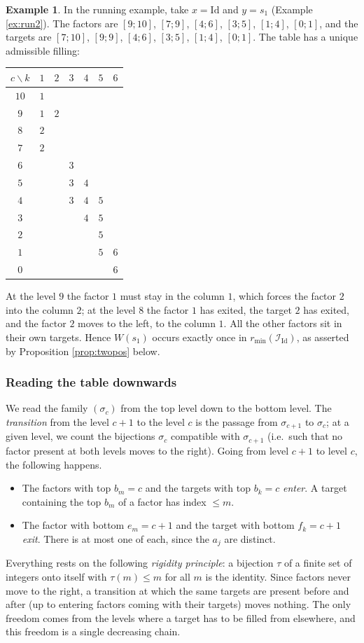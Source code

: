 \documentclass[a4paper,12pt,leqno]{amsart}
\newcommand{\caI}{\mathcal{I}}
\theoremstyle{plain}
\theoremstyle{definition}
\theoremstyle{definition}
\newtheorem{example}[thm]{Example}
\newcommand{\Id}{\mathrm{Id}}
\begin{document}
\begin{example}\label{ex:table} In the running example, take $x=\Id$ and $y=s_1$ (Example
\ref{ex:run2}). The factors are $[9;10]$, $[7;9]$, $[4;6]$, $[3;5]$, $[1;4]$, $[0;1]$, and the targets are
$[7;10]$, $[9;9]$, $[4;6]$, $[3;5]$, $[1;4]$, $[0;1]$. The table has a unique admissible filling:
\begin{center}
\begin{tabular}{c|cccccc}
$c\backslash k$ & $1$ & $2$ & $3$ & $4$ & $5$ & $6$\\\hline
$10$ & $1$ &&&&&\\
$9$ & $1$ & $2$ &&&&\\
$8$ & $2$ &&&&&\\
$7$ & $2$ &&&&&\\
$6$ &&& $3$ &&&\\
$5$ &&& $3$ & $4$ &&\\
$4$ &&& $3$ & $4$ & $5$ &\\
$3$ &&&& $4$ & $5$ &\\
$2$ &&&&& $5$ &\\
$1$ &&&&& $5$ & $6$\\
$0$ &&&&&& $6$
\end{tabular}
\end{center}
At the level $9$ the factor $1$ must stay in the column $1$, which forces the factor $2$ into the
column $2$; at the level $8$ the factor $1$ has exited, the target $2$ has exited, and the factor $2$
moves to the left, to the column $1$. All the other factors sit in their own targets. Hence $W(s_1)$
occurs exactly once in $r_{\min}(\caI_{\Id})$, as asserted by Proposition \ref{prop:twopos} below.
\end{example}

\subsubsection*{Reading the table downwards}
We read the family $(\sigma_c)$ from the top level down to the bottom level. The \emph{transition}
from the level $c+1$ to the level $c$ is the passage from $\sigma_{c+1}$ to $\sigma_c$; at a given
level, we count the bijections $\sigma_c$ compatible with $\sigma_{c+1}$ (i.e.\ such that no factor
present at both levels moves to the right). Going from level $c+1$ to level $c$, the following
happens.
\begin{itemize}
\item The factors with top $b_m=c$ and the targets with top $b_k=c$ \emph{enter}. A target containing
the top $b_m$ of a factor has index $\leq m$.
\item The factor with bottom $e_m=c+1$ and the target with bottom $f_k=c+1$ \emph{exit}. There is at
most one of each, since the $a_j$ are distinct.
\end{itemize}
Everything rests on the following \emph{rigidity principle}: a bijection $\tau$ of a finite set of
integers onto itself with $\tau(m)\leq m$ for all $m$ is the identity. Since factors never move to the
right, a transition at which the same targets are present before and after (up to entering factors
coming with their targets) moves nothing. The only freedom comes from the levels where a target has to
be filled from elsewhere, and this freedom is a single decreasing chain.
\end{document}
